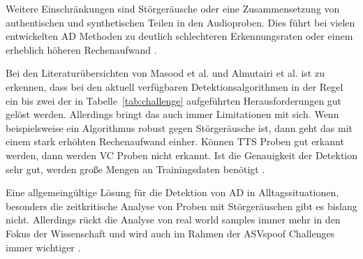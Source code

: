 Weitere Einschränkungen sind Störgeräusche oder eine Zusammensetzung von authentischen und synthetischen Teilen in den Audioproben.
Dies führt bei vielen entwickelten AD Methoden zu deutlich schlechteren Erkennungsraten oder einem erheblich höheren Rechenaufwand \citep[][]{Masood2022}.

Bei den Literaturübersichten von Masood et al. und Almutairi et al. ist zu erkennen, dass bei den aktuell verfügbaren Detektionsalgorithmen in der Regel ein bis zwei der in Tabelle~\ref{tab:challenge} aufgeführten Herausforderungen gut gelöst werden.
Allerdings bringt das auch immer Limitationen mit sich.
Wenn beispielsweise ein Algorithmus robust gegen Störgeräusche ist, dann geht das mit einem stark erhöhten Rechenaufwand einher.
Können TTS Proben gut erkannt werden, dann werden VC Proben nicht erkannt.
Ist die Genauigkeit der Detektion sehr gut, werden große Mengen an Trainingsdaten benötigt \citep[][]{Masood2022,Almutairi2022}.

Eine allgemeingültige Lösung für die Detektion von AD in Alltagssituationen, besonders die zeitkritische Analyse von Proben mit Störgeräuschen gibt es bislang nicht.
Allerdings rückt die Analyse von \glqq{}real world samples\grqq{} immer mehr in den Fokus der Wissenschaft und wird auch im Rahmen der ASVspoof Challenges immer wichtiger \citep[][]{Yamagishi2021}.
